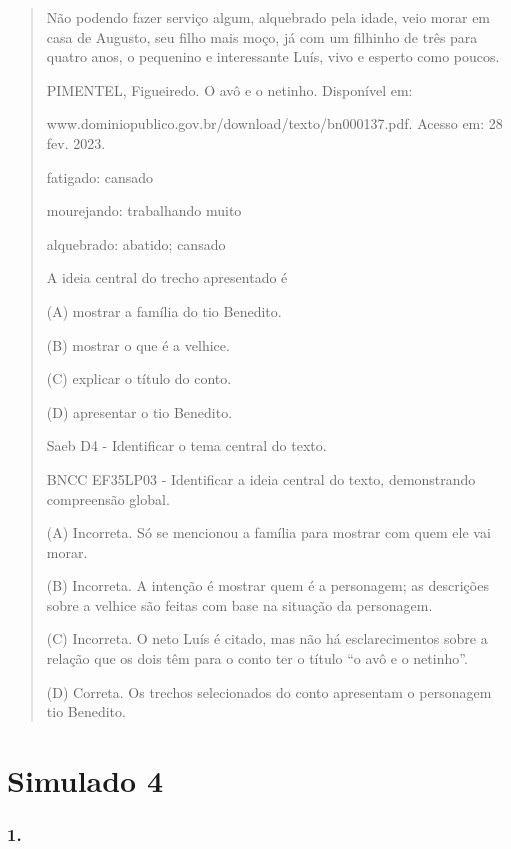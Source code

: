 \begin{quote}
Não podendo fazer serviço algum, alquebrado pela idade, veio morar em
casa de Augusto, seu filho mais moço, já com um filhinho de três para
quatro anos, o pequenino e interessante Luís, vivo e esperto como
poucos.

PIMENTEL, Figueiredo. O avô e o netinho. Disponível em:

www.dominiopublico.gov.br/download/texto/bn000137.pdf. Acesso em: 28
fev. 2023.

fatigado: cansado

mourejando: trabalhando muito

alquebrado: abatido; cansado

A ideia central do trecho apresentado é

(A) mostrar a família do tio Benedito.

(B) mostrar o que é a velhice.

(C) explicar o título do conto.

(D) apresentar o tio Benedito.

Saeb D4 - Identificar o tema central do texto.

BNCC EF35LP03 - Identificar a ideia central do texto, demonstrando
compreensão global.

(A) Incorreta. Só se mencionou a família para mostrar com quem ele vai
morar.

(B) Incorreta. A intenção é mostrar quem é a personagem; as descrições
sobre a velhice são feitas com base na situação da personagem.

(C) Incorreta. O neto Luís é citado, mas não há esclarecimentos sobre a
relação que os dois têm para o conto ter o título ``o avô e o netinho''.

(D) Correta. Os trechos selecionados do conto apresentam o personagem
tio Benedito.
\end{quote}

\section{Simulado 4}\label{simulado-4}

\subsubsection{1. }\label{section-91}

